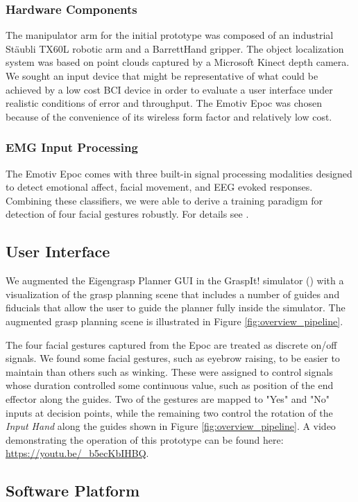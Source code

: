 \subsubsection{Hardware Components}The manipulator arm for the initial prototype was composed of an industrial St\"{a}ubli TX60L robotic arm and a BarrettHand gripper. The object localization system was based on point clouds captured by a Microsoft Kinect depth camera. We sought an input device that might be representative of what could be achieved by a low cost BCI device in order to evaluate a user interface under realistic conditions of error and throughput. The Emotiv Epoc was chosen because of the convenience of its wireless form factor and relatively low cost. 

\subsubsection{EMG Input Processing}
The Emotiv Epoc comes with three built-in signal processing modalities designed to detect emotional affect, facial movement, and EEG evoked responses. Combining these classifiers, we were able to derive a training paradigm for detection of four facial gestures robustly. For details see \cite{Weisz2013}.

\subsection{User Interface}
We augmented the Eigengrasp Planner GUI in the GraspIt! simulator (\cite{Miller2004}) with a visualization of the grasp planning scene that includes a number of guides and fiducials that allow the user to guide the planner fully inside the simulator. The augmented grasp planning scene is illustrated in Figure \ref{fig:overview_pipeline}. 

The four facial gestures captured from the Epoc are treated as discrete on/off signals. We found some facial gestures, such as eyebrow raising, to be easier to maintain than others such as winking. These were assigned to control signals whose duration controlled some continuous value, such as position of the end effector along the guides. Two of the gestures are mapped to "Yes" and "No" inputs at decision points, while the remaining two control the rotation of the \emph{Input Hand} along the guides shown in Figure \ref{fig:overview_pipeline}. A video demonstrating the operation of this prototype can be found here: \url{https://youtu.be/_b5ecKbIHBQ}.

\subsection{Software Platform}

